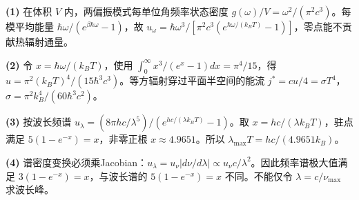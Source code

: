 \par\noindent\textbf{(1)} 在体积 \(V\) 内，两偏振模式每单位角频率状态密度 \(g(\omega)/V=\omega^2/(\pi^2c^3)\)。每模平均能量 \(\hbar\omega/(e^{\beta\hbar\omega}-1)\)，故 \(u_\omega=\hbar\omega^3/[\pi^2c^3(e^{\hbar\omega/(k_BT)}-1)]\)，零点能不贡献热辐射通量。
\par\noindent\textbf{(2)} 令 \(x=\hbar\omega/(k_BT)\)，使用 \(\int_0^\infty x^3/(e^x-1)dx=\pi^4/15\)，得 \(u=\pi^2(k_BT)^4/(15\hbar^3c^3)\)。等方辐射穿过平面半空间的能流 \(j^*=cu/4=\sigma T^4\)，\(\sigma=\pi^2k_B^4/(60\hbar^3c^2)\)。
\par\noindent\textbf{(3)} 按波长频谱 \(u_\lambda=(8\pi hc/\lambda^5)/(e^{hc/(\lambda k_BT)}-1)\)。取 \(x=hc/(\lambda k_BT)\)，驻点满足 \(5(1-e^{-x})=x\)，非零正根 \(x\approx4.9651\)。所以 \(\lambda_{\max}T=hc/(4.9651k_B)\)。
\par\noindent\textbf{(4)} 谱密度变换必须乘Jacobian：\(u_\lambda=u_\nu|d\nu/d\lambda|\propto u_\nu c/\lambda^2\)。因此频率谱极大值满足 \(3(1-e^{-x})=x\)，与波长谱的 \(5(1-e^{-x})=x\) 不同。不能仅令 \(\lambda=c/\nu_{\max}\) 求波长峰。

